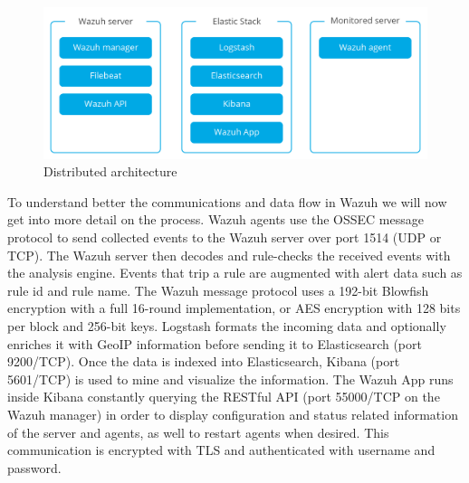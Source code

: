 \begin{figure}[H]
  \centering
	\includegraphics[width=\textwidth]{figuras/wazuh_distributed.png}
	\caption{Distributed architecture}
\end{figure}
\linej
To understand better the communications and data flow in Wazuh we will now get into more detail on the process\cite{wazuh_architecture2}\cite{wazuh_data_flow}.
\linej
\linej
Wazuh agents use the OSSEC message protocol to send collected events to the Wazuh server over port 1514 (UDP or TCP). The Wazuh server then decodes and rule-checks the received events with the analysis engine. Events that trip a rule are augmented with alert data such as rule id and rule name. The Wazuh message protocol uses a 192-bit Blowfish encryption with a full 16-round implementation, or AES encryption with 128 bits per block and 256-bit keys.
\linej
Logstash formats the incoming data and optionally enriches it with GeoIP information before sending it to Elasticsearch (port 9200/TCP). Once the data is indexed into Elasticsearch, Kibana (port 5601/TCP) is used to mine and visualize the information.
\linej
The Wazuh App runs inside Kibana constantly querying the RESTful API (port 55000/TCP on the Wazuh manager) in order to display configuration and status related information of the server and agents, as well to restart agents when desired. This communication is encrypted with TLS and authenticated with username and password.


